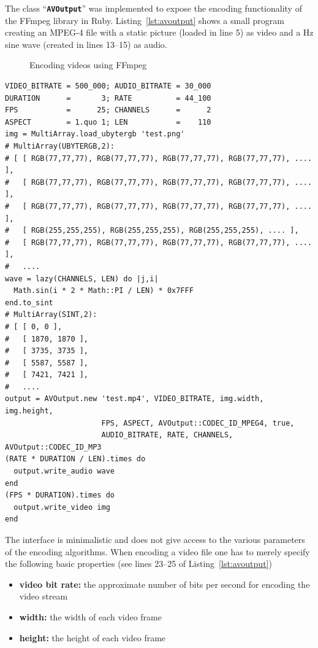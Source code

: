 \documentclass[12pt,a4paper,oneside,openright]{book}
\newcommand{\lst}[1]{Listing~\ref{lst:#1}}
\newcommand{\code}[1]{``\texttt{\textbf{\textcolor{codegray}{\small{#1}}}}''}
\begin{document}
\begin{CJK}{UTF8}{}
The class \code{AVOutput} was implemented to expose the encoding functionality of the FFmpeg library in Ruby. \lst{avoutput} shows a small program creating an MPEG-4 file with a static picture (loaded in line 5) as video and a \unit[400]{Hz} sine wave (created in lines 13--15) as audio.
\begin{figure}[htbp]
  \begin{center}
    \caption{Encoding videos using FFmpeg\label{fig:encoder}}
  \end{center}
\end{figure}
\lstset{language=Ruby,frame=single,numbers=left}
\begin{lstlisting}[float,caption={Writing a video file},label=lst:avoutput]
VIDEO_BITRATE = 500_000; AUDIO_BITRATE = 30_000
DURATION      =       3; RATE          = 44_100
FPS           =      25; CHANNELS      =      2
ASPECT        = 1.quo 1; LEN           =    110
img = MultiArray.load_ubytergb 'test.png'
# MultiArray(UBYTERGB,2):
# [ [ RGB(77,77,77), RGB(77,77,77), RGB(77,77,77), RGB(77,77,77), .... ],
#   [ RGB(77,77,77), RGB(77,77,77), RGB(77,77,77), RGB(77,77,77), .... ],
#   [ RGB(77,77,77), RGB(77,77,77), RGB(77,77,77), RGB(77,77,77), .... ],
#   [ RGB(255,255,255), RGB(255,255,255), RGB(255,255,255), .... ],
#   [ RGB(77,77,77), RGB(77,77,77), RGB(77,77,77), RGB(77,77,77), .... ],
#   ....
wave = lazy(CHANNELS, LEN) do |j,i|
  Math.sin(i * 2 * Math::PI / LEN) * 0x7FFF
end.to_sint
# MultiArray(SINT,2):
# [ [ 0, 0 ],
#   [ 1870, 1870 ],
#   [ 3735, 3735 ],
#   [ 5587, 5587 ],
#   [ 7421, 7421 ],
#   ....
output = AVOutput.new 'test.mp4', VIDEO_BITRATE, img.width, img.height,
                      FPS, ASPECT, AVOutput::CODEC_ID_MPEG4, true,
                      AUDIO_BITRATE, RATE, CHANNELS, AVOutput::CODEC_ID_MP3
(RATE * DURATION / LEN).times do
  output.write_audio wave
end
(FPS * DURATION).times do
  output.write_video img
end
\end{lstlisting}
The interface is minimalistic and does not give access to the various parameters of the encoding algorithms. When encoding a video file one has to merely specify the following basic properties (see lines 23--25 of \lst{avoutput})
\begin{itemize}
\item \textbf{video bit rate:} the approximate number of bits per second for encoding the video stream
\item \textbf{width:} the width of each video frame
\item \textbf{height:} the height of each video frame

\end{itemize}
\end{CJK}
\end{document}

